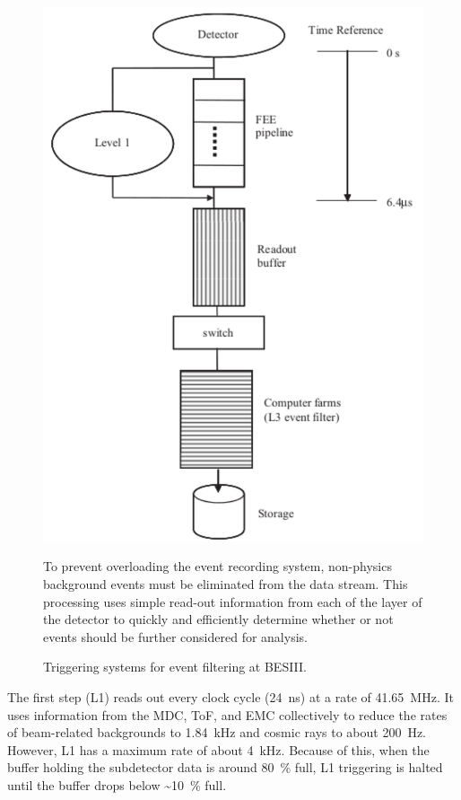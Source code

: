 \begin{figure}[H]
\centering
\includegraphics[scale=0.75]{figures/images/triggering.pdf}
\caption{Triggering systems for event filtering at BESIII.}
{To prevent overloading the event recording system, non-physics background events must be eliminated from the data stream.
This processing uses simple read-out information from each of the layer of the detector to quickly and efficiently determine whether or not events should be further considered for analysis.}
\label{fig:triggering}
\end{figure}

The first step (L1) reads out every clock cycle (\SI{24}{\ns}) at a rate of \SI{41.65}{\MHz}.
It uses information from the MDC, ToF, and EMC collectively to reduce the rates of beam-related backgrounds to \SI{1.84}{\kHz} and cosmic rays to about \SI{200}{\Hz}.
However, L1 has a maximum rate of about \SI{4}{\kHz}.
Because of this, when the buffer holding the subdetector data is around \SI{80}{\%} full, L1 triggering is halted until the buffer drops below \SI{~10}{\%} full.


